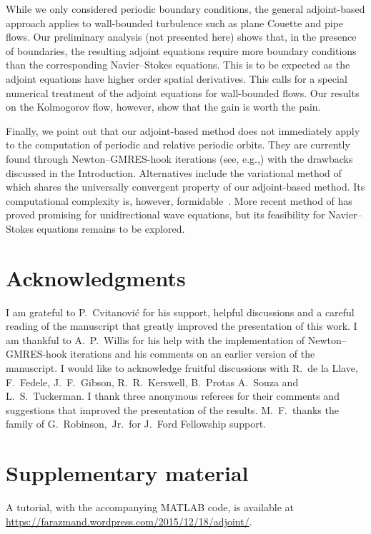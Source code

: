 \documentclass{jfm}
\begin{document}
While we only considered periodic boundary conditions, the general adjoint-based approach applies
to wall-bounded turbulence such as plane Couette and pipe flows. Our preliminary analysis
(not presented here) shows that, in the presence of boundaries, the resulting adjoint equations
require more boundary conditions than the corresponding Navier--Stokes equations. This is to be
expected as the adjoint equations have higher order spatial derivatives. This calls for
a special numerical treatment of the adjoint equations for wall-bounded flows. Our results
on the Kolmogorov flow, however, show that the gain is worth the pain.

Finally, we point out that our adjoint-based method does not immediately
apply to the computation of periodic and relative periodic orbits.
They are currently found through Newton--GMRES-hook iterations
(see, e.g.,) with the drawbacks discussed in the Introduction.
Alternatives include the variational method of~ which shares the universally
convergent property of our adjoint-based method. Its computational complexity is, however,
formidable~\citep{Faz10}. More recent method of has proved promising for
unidirectional wave equations, but its feasibility for Navier--Stokes equations remains to
be explored.


\section*{Acknowledgments}
I am grateful to P.~Cvitanovi\'c for his support, helpful discussions
and a careful reading of the manuscript
that greatly improved the presentation of this work.
I am thankful to A.~P.~Willis for
his help with the implementation of Newton--GMRES-hook iterations
and his comments on an earlier version of the manuscript.
I would like to acknowledge fruitful discussions with R.~de la Llave, F.~Fedele, J.~F.~Gibson,
R.~R.~Kerswell, B.~Protas A.~Souza and L.~S.~Tuckerman.
I thank three anonymous referees for their comments and suggestions that 
improved the presentation of the results.
M.~F.\ thanks the family of G.~Robinson,~Jr.\ for J.~Ford Fellowship
support.

\section*{Supplementary material}
A tutorial, with the accompanying MATLAB code, is available  at\\
\href{https://farazmand.wordpress.com/2015/12/18/adjoint/}{https://farazmand.wordpress.com/2015/12/18/adjoint/}.
\end{document}
